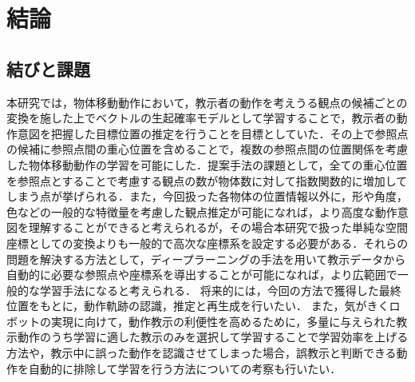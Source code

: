 ﻿%
\chapter{結論}

\section{結びと課題}

本研究では，物体移動動作において，教示者の動作を考えうる観点の候補ごとの変換を施した上でベクトルの生起確率モデルとして学習することで，教示者の動作意図を把握した目標位置の推定を行うことを目標としていた．その上で参照点の候補に参照点間の重心位置を含めることで，複数の参照点間の位置関係を考慮した物体移動動作の学習を可能にした．提案手法の課題として，全ての重心位置を参照点とすることで考慮する観点の数が物体数に対して指数関数的に増加してしまう点が挙げられる．また，今回扱った各物体の位置情報以外に，形や角度，色などの一般的な特徴量を考慮した観点推定が可能になれば，より高度な動作意図を理解することができると考えられるが，その場合本研究で扱った単純な空間座標としての変換よりも一般的で高次な座標系を設定する必要がある．それらの問題を解決する方法として，ディープラーニングの手法を用いて教示データから自動的に必要な参照点や座標系を導出することが可能になれば，より広範囲で一般的な学習手法になると考えられる．
将来的には，今回の方法で獲得した最終位置をもとに，動作軌跡の認識，推定と再生成を行いたい．
また，気がきくロボットの実現に向けて，動作教示の利便性を高めるために，多量に与えられた教示動作のうち学習に適した教示のみを選択して学習することで学習効率を上げる方法や，教示中に誤った動作を認識させてしまった場合，誤教示と判断できる動作を自動的に排除して学習を行う方法についての考察も行いたい．

